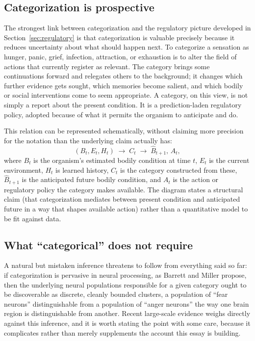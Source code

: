 \documentclass[11pt]{article}
\begin{document}
\subsection{Categorization is prospective}

The strongest link between categorization and the regulatory picture developed in Section~\ref{sec:regulatory} is that categorization is valuable precisely because it reduces uncertainty about what should happen next. To categorize a sensation as hunger, panic, grief, infection, attraction, or exhaustion is to alter the field of actions that currently register as relevant. The category brings some continuations forward and relegates others to the background; it changes which further evidence gets sought, which memories become salient, and which bodily or social interventions come to seem appropriate. A category, on this view, is not simply a report about the present condition. It is a prediction-laden regulatory policy, adopted because of what it permits the organism to anticipate and do.

This relation can be represented schematically, without claiming more precision for the notation than the underlying claim actually has:
\[
(B_t, E_t, H_t) \;\longrightarrow\; C_t \;\longrightarrow\; \widehat{B}_{t+1},\, A_t,
\]
where $B_t$ is the organism's estimated bodily condition at time $t$, $E_t$ is the current environment, $H_t$ is learned history, $C_t$ is the category constructed from these, $\widehat{B}_{t+1}$ is the anticipated future bodily condition, and $A_t$ is the action or regulatory policy the category makes available. The diagram states a structural claim (that categorization mediates between present condition and anticipated future in a way that shapes available action) rather than a quantitative model to be fit against data.

\subsection{What ``categorical'' does not require}

A natural but mistaken inference threatens to follow from everything said so far: if categorization is pervasive in neural processing, as Barrett and Miller propose, then the underlying neural populations responsible for a given category ought to be discoverable as discrete, cleanly bounded clusters, a population of ``fear neurons'' distinguishable from a population of ``anger neurons'' the way one brain region is distinguishable from another. Recent large-scale evidence weighs directly against this inference, and it is worth stating the point with some care, because it complicates rather than merely supplements the account this essay is building.
\end{document}
